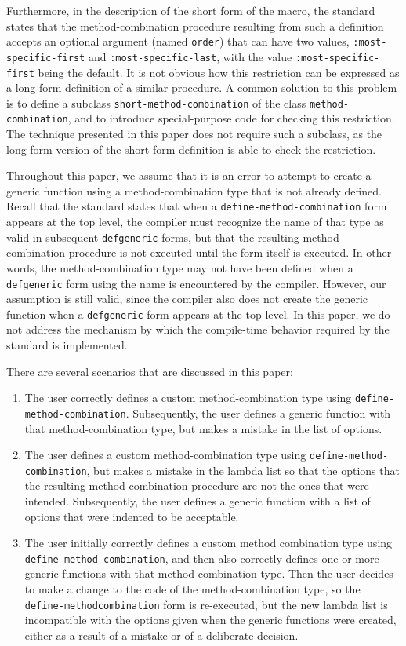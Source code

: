 Furthermore, in the description of the short form of the macro, the
standard states that the method-combination procedure resulting from
such a definition accepts an optional argument (named \texttt{order})
that can have two values, \texttt{:most-specific-first} and
\texttt{:most-specific-last}, with the value
\texttt{:most-specific-first} being the default.  It is not obvious
how this restriction can be expressed as a long-form definition of a
similar procedure.  A common solution to this problem is to define a
subclass \texttt{short-method-combination} of the class
\texttt{method-combination}, and to introduce special-purpose code for
checking this restriction.  The technique presented in this paper does
not require such a subclass, as the long-form version of the
short-form definition is able to check the restriction.

Throughout this paper, we assume that it is an error to attempt to
create a generic function using a method-combination type that is not
already defined.  Recall that the standard states that when a
\texttt{define-method-combination} form appears at the top level, the
compiler must recognize the name of that type as valid in subsequent
\texttt{defgeneric} forms, but that the resulting method-combination
procedure is not executed until the form itself is executed.  In other
words, the method-combination type may not have been defined when a
\texttt{defgeneric} form using the name is encountered by the
compiler.  However, our assumption is still valid, since the compiler
also does not create the generic function when a \texttt{defgeneric}
form appears at the top level.  In this paper, we do not address the
mechanism by which the compile-time behavior required by the standard
is implemented.

There are several scenarios that are discussed in this paper:

\begin{enumerate}
\item The user correctly defines a custom method-combination type
  using \texttt{define-method-combination}.  Subsequently, the user
  defines a generic function with that method-combination type, but
  makes a mistake in the list of options.
\item The user defines a custom method-combination type using
  \texttt{define-method-combination}, but makes a mistake in the
  lambda list so that the options that the resulting
  method-combination procedure are not the ones that were intended.
  Subsequently, the user defines a generic function with a list of
  options that were indented to be acceptable.
\item The user initially correctly defines a custom method combination
  type using \texttt{define-method-combination}, and then also
  correctly defines one or more generic functions with that method
  combination type.  Then the user decides to make a change to the
  code of the method-combination type, so the
  \texttt{define-method\-combination} form is re-executed, but the new
  lambda list is incompatible with the options given when the generic
  functions were created, either as a result of a mistake or of a
  deliberate decision.
\end{enumerate}


